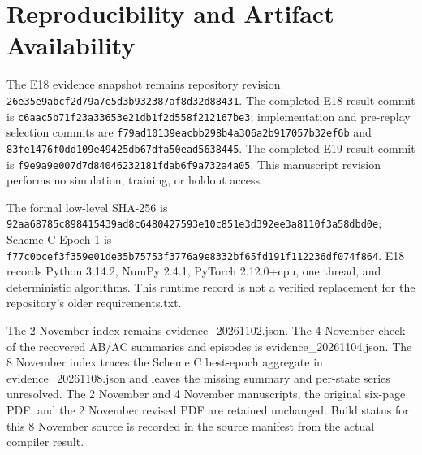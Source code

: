 \section*{Reproducibility and Artifact Availability}

The E18 evidence snapshot remains repository revision \nolinkurl{26e35e9abcf2d79a7e5d3b932387af8d32d88431}. The completed E18 result commit is \nolinkurl{c6aac5b71f23a33653e21db1f2d558f212167be3}; implementation and pre-replay selection commits are \nolinkurl{f79ad10139eacbb298b4a306a2b917057b32ef6b} and \nolinkurl{83fe1476f0dd109e49425db67dfa50ead5638445}. The completed E19 result commit is \nolinkurl{f9e9a9e007d7d84046232181fdab6f9a732a4a05}. This manuscript revision performs no simulation, training, or holdout access.

The formal low-level SHA-256 is \nolinkurl{92aa68785c898415439ad8c6480427593e10c851e3d392ee3a8110f3a58dbd0e}; Scheme C Epoch 1 is \nolinkurl{f77c0bcef3f359e01de35b75753f3776a9e8332bf65fd191f112236df074f864}. E18 records Python 3.14.2, NumPy 2.4.1, PyTorch 2.12.0+cpu, one thread, and deterministic algorithms. This runtime record is not a verified replacement for the repository's older requirements.txt.

The 2 November index remains evidence\_20261102.json. The 4 November check of the recovered AB/AC summaries and episodes is evidence\_20261104.json. The 8 November index traces the Scheme C best-epoch aggregate in evidence\_20261108.json and leaves the missing summary and per-state series unresolved. The 2 November and 4 November manuscripts, the original six-page PDF, and the 2 November revised PDF are retained unchanged. Build status for this 8 November source is recorded in the source manifest from the actual compiler result.
